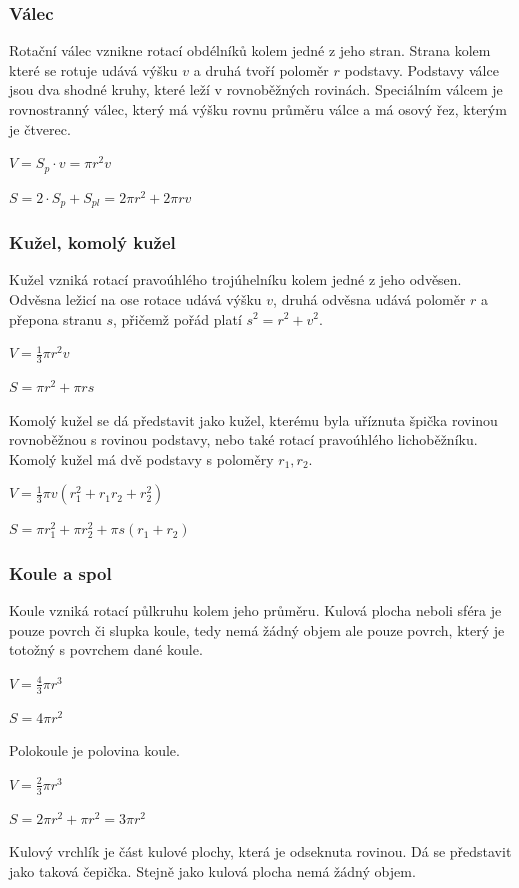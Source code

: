 \documentclass[12pt]{article}
\begin{document}
\subsubsection*{Válec}
Rotační válec vznikne rotací obdélníků kolem jedné z jeho stran. Strana kolem které se rotuje udává
výšku $v$ a druhá tvoří poloměr $r$ podstavy. Podstavy válce jsou dva shodné kruhy, které leží v
rovnoběžných rovinách. Speciálním válcem je rovnostranný válec, který má výšku rovnu průměru válce a
má osový řez, kterým je čtverec.

$V = S_p \cdot v = \pi r^2 v$

$S = 2 \cdot S_p + S_{pl} = 2 \pi r^2 + 2 \pi r v$

\subsubsection*{Kužel, komolý kužel}
Kužel vzniká rotací pravoúhlého trojúhelníku kolem jedné z jeho odvěsen. Odvěsna ležicí na ose
rotace udává výšku $v$, druhá odvěsna udává poloměr $r$ a přepona stranu $s$, přičemž pořád platí
$s^2 = r^2 + v^2$.

$V = \frac{1}{3} \pi r^2 v$

$S = \pi r^2 + \pi r s$

Komolý kužel se dá představit jako kužel, kterému byla uříznuta špička rovinou rovnoběžnou s rovinou
podstavy, nebo také rotací pravoúhlého lichoběžníku. Komolý kužel má dvě podstavy s poloměry $r_1,
r_2$.

$V = \frac{1}{3} \pi v(r_1^2 + r_1 r_2 + r_2^2)$

$S = \pi r_1^2 + \pi r_2^2 + \pi s(r_1 + r_2)$
\subsubsection*{Koule a spol}
Koule vzniká rotací půlkruhu kolem jeho průměru. Kulová plocha neboli sféra je pouze povrch či slupka
koule, tedy nemá žádný objem ale pouze povrch, který je totožný s povrchem dané koule.

$V = \frac{4}{3} \pi r^3$

$S = 4 \pi r^2$

Polokoule je polovina koule.

$V = \frac{2}{3} \pi r^3$

$S = 2 \pi r^2 + \pi r^2 = 3 \pi r^2$

Kulový vrchlík je část kulové plochy, která je odseknuta rovinou. Dá se představit jako taková 
čepička. Stejně jako kulová plocha nemá žádný objem.
\end{document}
